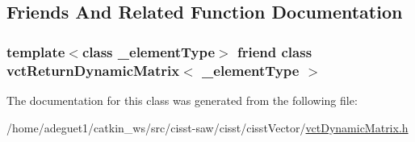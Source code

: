 \subsection{Friends And Related Function Documentation}
\hypertarget{classvct_dynamic_matrix_a15520a0716ed8e67f2cba2a95cbe51a7}{
\subsubsection[{vct\-Return\-Dynamic\-Matrix$<$ \-\_\-element\-Type $>$}]{\setlength{\rightskip}{0pt plus 5cm}template$<$class \-\_\-element\-Type$>$ friend class {\bf vct\-Return\-Dynamic\-Matrix}$<$ \-\_\-element\-Type $>$\hspace{0.3cm}{\ttfamily [friend]}}}\label{classvct_dynamic_matrix_a15520a0716ed8e67f2cba2a95cbe51a7}


The documentation for this class was generated from the following file\-:\begin{DoxyCompactItemize}
\item 
/home/adeguet1/catkin\-\_\-ws/src/cisst-\/saw/cisst/cisst\-Vector/\hyperlink{vct_dynamic_matrix_8h}{vct\-Dynamic\-Matrix.\-h}\end{DoxyCompactItemize}
